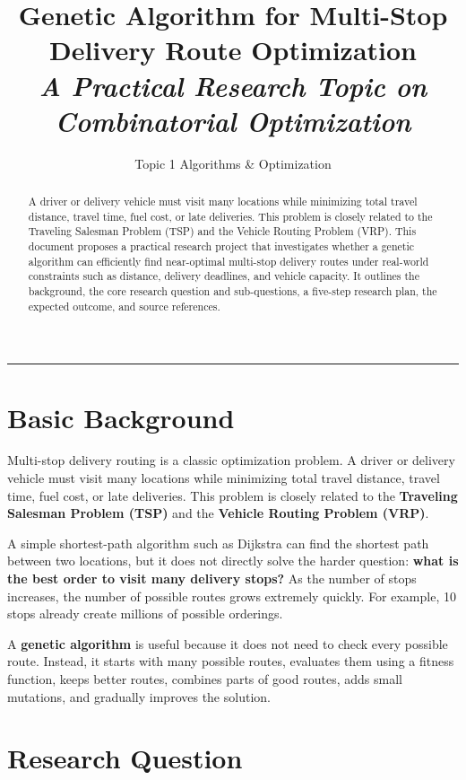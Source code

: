 \documentclass[11pt,a4paper]{article}
\title{\vspace{-0.6in}\bfseries\Large Genetic Algorithm for Multi-Stop Delivery Route Optimization\\[2pt]
\large\mdseries\itshape A Practical Research Topic on Combinatorial Optimization}
\author[1]{Topic 1 \textbullet{} Algorithms \& Optimization}
\affil[1]{Practical Algorithm Research Series \textbullet{} 2026}
\date{}
\begin{document}
\maketitle
\thispagestyle{fancy}

\begin{abstract}
\noindent
A driver or delivery vehicle must visit many locations while minimizing total travel distance, travel time, fuel cost, or late deliveries. This problem is closely related to the Traveling Salesman Problem (TSP) and the Vehicle Routing Problem (VRP). This document proposes a practical research project that investigates whether a genetic algorithm can efficiently find near-optimal multi-stop delivery routes under real-world constraints such as distance, delivery deadlines, and vehicle capacity. It outlines the background, the core research question and sub-questions, a five-step research plan, the expected outcome, and source references.
\end{abstract}

\noindent\rule{\textwidth}{0.4pt}

\section{Basic Background}

Multi-stop delivery routing is a classic optimization problem. A driver or delivery vehicle must visit many locations while minimizing total travel distance, travel time, fuel cost, or late deliveries. This problem is closely related to the \textbf{Traveling Salesman Problem (TSP)} and the \textbf{Vehicle Routing Problem (VRP)}.

A simple shortest-path algorithm such as Dijkstra can find the shortest path between two locations, but it does not directly solve the harder question: \textbf{what is the best order to visit many delivery stops?} As the number of stops increases, the number of possible routes grows extremely quickly. For example, 10 stops already create millions of possible orderings.

A \textbf{genetic algorithm} is useful because it does not need to check every possible route. Instead, it starts with many possible routes, evaluates them using a fitness function, keeps better routes, combines parts of good routes, adds small mutations, and gradually improves the solution.

\section{Research Question}
\end{document}
